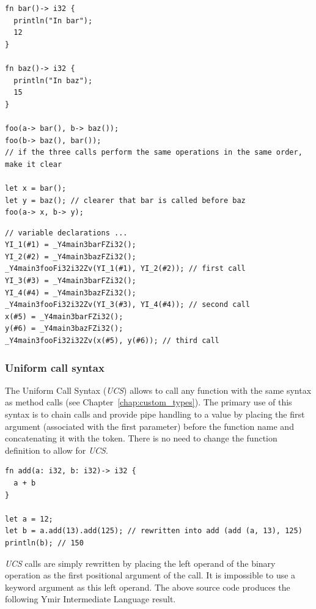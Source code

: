 \begin{lstlisting}[style=coloredverbatim]
fn bar()-> i32 {
  println("In bar");
  12
}

fn baz()-> i32 {
  println("In baz");
  15
}

foo(a-> bar(), b-> baz());
foo(b-> baz(), bar());
// if the three calls perform the same operations in the same order, make it clear

let x = bar();
let y = baz(); // clearer that bar is called before baz
foo(a-> x, b-> y);
\end{lstlisting}
\smallskip

\begin{lstlisting}[style=lyilVerb]
// variable declarations ...
YI_1(#1) = _Y4main3barFZi32();
YI_2(#2) = _Y4main3bazFZi32();
_Y4main3fooFi32i32Zv(YI_1(#1), YI_2(#2)); // first call
YI_3(#3) = _Y4main3barFZi32();
YI_4(#4) = _Y4main3bazFZi32();
_Y4main3fooFi32i32Zv(YI_3(#3), YI_4(#4)); // second call
x(#5) = _Y4main3barFZi32();
y(#6) = _Y4main3bazFZi32();
_Y4main3fooFi32i32Zv(x(#5), y(#6)); // third call
\end{lstlisting}

\subsubsection*{Uniform call syntax}

The Uniform Call Syntax (\textit{UCS}) allows to call any function with the same
syntax as method calls (see Chapter~\ref{chap:custom_types}). The primary use of
this syntax is to chain calls and provide pipe handling to a value by placing
the first argument (associated with the first parameter) before the function
name and concatenating it with the  token. There is no need to change
the function definition to allow for \textit{UCS}.

\begin{lstlisting}[style=coloredverbatim]
fn add(a: i32, b: i32)-> i32 {
  a + b
}

let a = 12;
let b = a.add(13).add(125); // rewritten into add (add (a, 13), 125)
println(b); // 150
\end{lstlisting}

\textit{UCS} calls are simply rewritten by placing the left operand of the
binary operation  as the first positional argument of the call. It is
impossible to use a keyword argument as this left operand. The above source code
produces the following Ymir Intermediate Language result.
\smallskip

